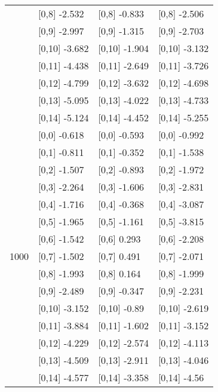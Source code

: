 \begin{table}
\begin{tabular}[t]{llll}
 & {}[0,8] -2.532 & {}[0,8] -0.833 & {}[0,8] -2.506\\
 & {}[0,9] -2.997 & {}[0,9] -1.315 & {}[0,9] -2.703\\
\addlinespace
 & {}[0,10] -3.682 & {}[0,10] -1.904 & {}[0,10] -3.132\\
 & {}[0,11] -4.438 & {}[0,11] -2.649 & {}[0,11] -3.726\\
 & {}[0,12] -4.799 & {}[0,12] -3.632 & {}[0,12] -4.698\\
 & {}[0,13] -5.095 & {}[0,13] -4.022 & {}[0,13] -4.733\\
 & {}[0,14] -5.124 & {}[0,14] -4.452 & {}[0,14] -5.255\\
\addlinespace
 & {}[0,0] -0.618 & {}[0,0] -0.593 & {}[0,0] -0.992\\
 & {}[0,1] -0.811 & {}[0,1] -0.352 & {}[0,1] -1.538\\
 & {}[0,2] -1.507 & {}[0,2] -0.893 & {}[0,2] -1.972\\
 & {}[0,3] -2.264 & {}[0,3] -1.606 & {}[0,3] -2.831\\
 & {}[0,4] -1.716 & {}[0,4] -0.368 & {}[0,4] -3.087\\
\addlinespace
 & {}[0,5] -1.965 & {}[0,5] -1.161 & {}[0,5] -3.815\\
 & {}[0,6] -1.542 & {}[0,6] 0.293 & {}[0,6] -2.208\\
1000 & {}[0,7] -1.502 & {}[0,7] 0.491 & {}[0,7] -2.071\\
 & {}[0,8] -1.993 & {}[0,8] 0.164 & {}[0,8] -1.999\\
 & {}[0,9] -2.489 & {}[0,9] -0.347 & {}[0,9] -2.231\\
\addlinespace
 & {}[0,10] -3.152 & {}[0,10] -0.89 & {}[0,10] -2.619\\
 & {}[0,11] -3.884 & {}[0,11] -1.602 & {}[0,11] -3.152\\
 & {}[0,12] -4.229 & {}[0,12] -2.574 & {}[0,12] -4.113\\
 & {}[0,13] -4.509 & {}[0,13] -2.911 & {}[0,13] -4.046\\
 & {}[0,14] -4.577 & {}[0,14] -3.358 & {}[0,14] -4.56\\
\bottomrule
\end{tabular}
\end{table}
